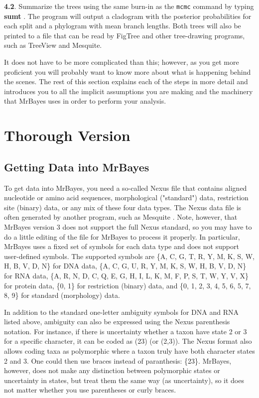 \documentclass[12pt]{book}
\begin{document}
\textbf{4.2}. Summarize the trees using the same burn-in as the \texttt{mcmc} command by typing \textbf{sumt}
. The program will output a cladogram with the posterior probabilities for each split and a phylogram with
 mean branch lengths. Both trees will also be printed to a file that can be read by FigTree and other
 tree-drawing programs, such as TreeView and Mesquite.

It does not have to be more complicated than this; however, as you get more proficient you will probably
 want to know more about what is happening behind the scenes. The rest of this section explains each of
 the steps in more detail and introduces you to all the implicit assumptions you are making and the
 machinery that MrBayes uses in order to perform your analysis.

\section{Thorough Version}

\subsection{Getting Data into MrBayes}
To get data into MrBayes, you need a so-called Nexus file that contains aligned nucleotide or amino acid 
sequences, morphological ("standard") data, restriction site (binary) data, or any mix of these four data
 types. The Nexus data file is often generated by another program, such as Mesquite \citep{Maddison06}.
 Note, however, that
 MrBayes version 3 does not support the full Nexus standard, so you may have to do a little editing of the
 file for MrBayes to process it properly. In particular, MrBayes uses a fixed set of symbols for each data
 type and does not support user-defined symbols. The supported symbols are 
 \{A, C, G, T, R, Y, M, K, S, W, H, B, V, D, N\} for DNA data, 
 \{A, C, G, U, R, Y, M, K, S, W, H, B, V, D, N\} for RNA data, 
 \{A, R, N, D, C, Q, E, G, H, I, L, K, M, F, P, S, T, W, Y, V, X\} for protein data, \{0, 1\} for 
 restriction (binary) data, and \{0, 1, 2, 3, 4, 5, 6, 5, 7, 8, 9\} for standard (morphology) data. 

 In addition to the standard one-letter ambiguity symbols for DNA and RNA listed above, ambiguity can also
 be expressed using the Nexus parenthesis notation. For instance, if there is uncertainty whether a taxon
 have state 2 or 3 for a specific character, it can be coded as (23) (or (2,3)). The Nexus format also
 allows coding taxa as polymorphic \textemdash where a taxon truly have both character states 2 and 3.
 One could then use braces instead of paranthesis: \{23\}. MrBayes, however, does not make any distinction
 between polymorphic states or uncertainty in states, but treat them the same way (as uncertainty), so 
 it does not matter whether you use parentheses or curly braces.
 
\end{document}
